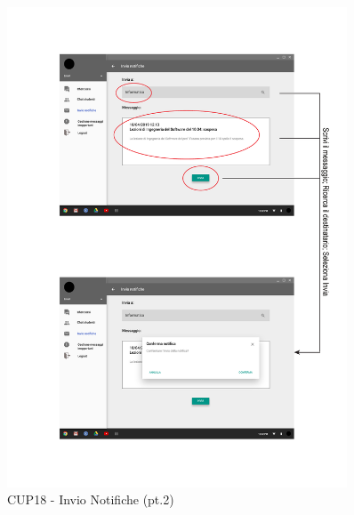 \begin{figure}
	\centering
	\includegraphics[width=0.9\textwidth]{imgs/gruppo6/activities/act_cup18_invio_notifiche2.pdf}
	\caption{CUP18 - Invio Notifiche (pt.2)}
	\label{fig:cup18-2}
\end{figure}

